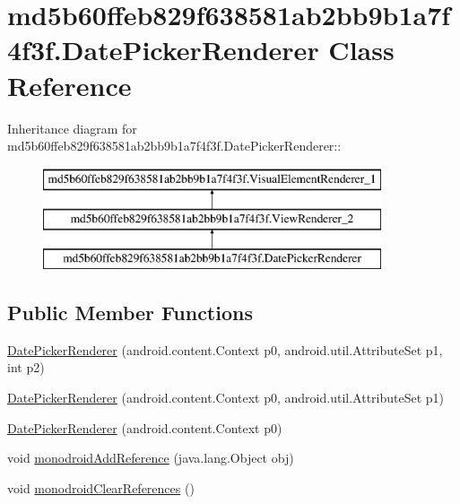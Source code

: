 \hypertarget{classmd5b60ffeb829f638581ab2bb9b1a7f4f3f_1_1_date_picker_renderer}{
\section{md5b60ffeb829f638581ab2bb9b1a7f4f3f.DatePickerRenderer Class Reference}
\label{classmd5b60ffeb829f638581ab2bb9b1a7f4f3f_1_1_date_picker_renderer}
}
Inheritance diagram for md5b60ffeb829f638581ab2bb9b1a7f4f3f.DatePickerRenderer::\begin{figure}[H]
\begin{center}
\leavevmode
\includegraphics[height=3cm]{classmd5b60ffeb829f638581ab2bb9b1a7f4f3f_1_1_date_picker_renderer}
\end{center}
\end{figure}
\subsection*{Public Member Functions}
\begin{CompactItemize}
\item 
\hyperlink{classmd5b60ffeb829f638581ab2bb9b1a7f4f3f_1_1_date_picker_renderer_9c9f3897fd07153d0786f2c0cd7f9137}{DatePickerRenderer} (android.content.Context p0, android.util.AttributeSet p1, int p2)
\item 
\hyperlink{classmd5b60ffeb829f638581ab2bb9b1a7f4f3f_1_1_date_picker_renderer_de65698654faac1638d89be69a76bf07}{DatePickerRenderer} (android.content.Context p0, android.util.AttributeSet p1)
\item 
\hyperlink{classmd5b60ffeb829f638581ab2bb9b1a7f4f3f_1_1_date_picker_renderer_e5cb2d0f611ae56a000a816dff6a4b6d}{DatePickerRenderer} (android.content.Context p0)
\item 
void \hyperlink{classmd5b60ffeb829f638581ab2bb9b1a7f4f3f_1_1_date_picker_renderer_3beb2afa3ed98862669dcc1fe7d6307c}{monodroidAddReference} (java.lang.Object obj)
\item 
void \hyperlink{classmd5b60ffeb829f638581ab2bb9b1a7f4f3f_1_1_date_picker_renderer_272024ba18637be81cb9cd68055ccc07}{monodroidClearReferences} ()
\end{CompactItemize}

